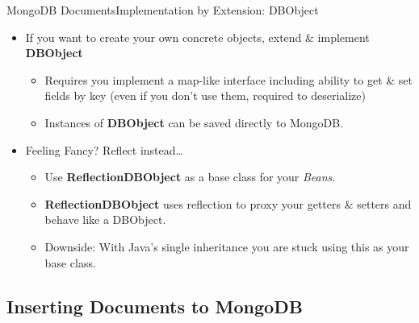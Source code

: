 \documentclass{beamer}
\begin{document}
\begin{frame}{MongoDB Documents}{Implementation by Extension: DBObject}
    \begin{itemize}
        \item If you want to create your own concrete objects, extend \& implement {\bf DBObject}
            \begin{itemize}
                \item Requires you implement a map-like interface including ability to get \& set fields by key (even if you don't use them, required to deserialize)
                \item Instances of {\bf DBObject} can be saved directly to MongoDB.
            \end{itemize}
        \item Feeling Fancy? Reflect instead\dots
            \begin{itemize}
                \item Use {\bf ReflectionDBObject} as a base class for your {\em Beans}.
                \item {\bf ReflectionDBObject} uses reflection to proxy your getters \& setters and behave like a DBObject.
                \item Downside: With Java's single inheritance you are stuck using this as your base class.
            \end{itemize}
    \end{itemize}
\end{frame}

\subsection[Inserting Documents to MongoDB]{Inserting Documents to MongoDB}
\end{document}
